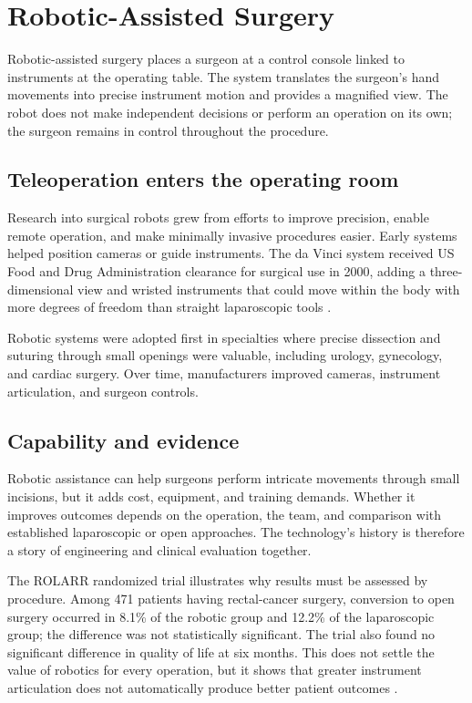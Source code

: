 \documentclass[12pt,oneside]{book}
\begin{document}
\chapter[Robotic-Assisted Surgery]{Robotic-Assisted Surgery}

Robotic-assisted surgery places a surgeon at a control console linked to
instruments at the operating table. The system translates the surgeon's hand
movements into precise instrument motion and provides a magnified view. The
robot does not make independent decisions or perform an operation on its own;
the surgeon remains in control throughout the procedure.

\section{Teleoperation enters the operating room}
Research into surgical robots grew from efforts to improve precision, enable remote operation, and make minimally invasive procedures easier. Early systems helped position cameras or guide instruments. The da Vinci system received US Food and Drug Administration clearance for surgical use in 2000, adding a three-dimensional view and wristed instruments that could move within the body with more degrees of freedom than straight laparoscopic tools \cite{roboticSurgeryHistory}.

Robotic systems were adopted first in specialties where precise dissection and
suturing through small openings were valuable, including urology, gynecology,
and cardiac surgery. Over time, manufacturers improved cameras, instrument
articulation, and surgeon controls.

\section{Capability and evidence}
Robotic assistance can help surgeons perform intricate movements through small incisions, but it adds cost, equipment, and training demands. Whether it improves outcomes depends on the operation, the team, and comparison with established laparoscopic or open approaches. The technology's history is therefore a story of engineering and clinical evaluation together.

The ROLARR randomized trial illustrates why results must be assessed by
procedure. Among 471 patients having rectal-cancer surgery, conversion to open
surgery occurred in 8.1\% of the robotic group and 12.2\% of the laparoscopic
group; the difference was not statistically significant. The trial also found
no significant difference in quality of life at six months. This does not
settle the value of robotics for every operation, but it shows that greater
instrument articulation does not automatically produce better patient outcomes
\cite{rolarrTrial}.
\end{document}
